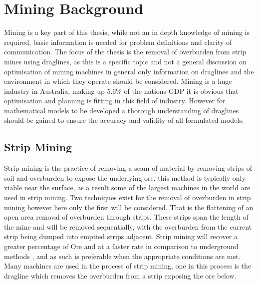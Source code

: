  \section{Mining Background}
Mining is a key part of this thesis, while not an in depth knowledge of mining is required, basic information is needed for problem definitions and clarity of communication. The focus of the thesis is the removal of overburden from strip mines using draglines, as this is a specific topic and not a general discussion on optimisation of mining machines in general only information on draglines and the environment in which they operate should be considered. Mining is a huge industry in Australia, making up 5.6\% of the nations GDP \cite{ExportStats} it is obvious that optimisation and planning is fitting in this field of industry\cite{DraglineDecade}.
However for mathematical models to be developed a thorough understanding of draglines should be gained to ensure the accuracy and validity of all formulated models. 
\subsection{Strip Mining}
Strip mining is the practice of removing a seam of material by removing strips of soil and overburden \cite{IntoOpenPit} to expose the underlying ore, this method is typically only viable near the surface, as a result some of the largest machines in the world are used in strip mining. Two techniques exist for the removal of overburden in strip mining \cite{Workpls} however here only the first will be considered. That is the flattening of an open area removal of overburden through strips. These strips span the length of the mine and will be removed sequentially, with the overburden from the current strip being dumped into emptied strips adjacent\cite{SMEBOOK}. Strip mining will recover a greater percentage of Ore and at a faster rate in comparison to underground methods \cite{SMEBOOK}, and as such is preferable when the appropriate conditions are met. Many machines are used in the process of strip mining, one in this process is the dragline which removes the overburden from a strip exposing the ore below\cite{IntoOpenPit}.
